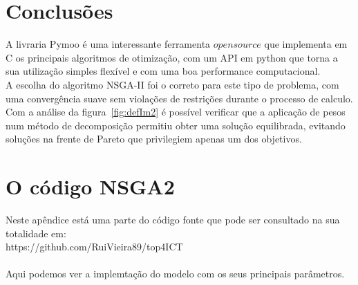 \documentclass[a4paper,12pt]{article}
\begin{document}
\section{Conclusões}

A livraria Pymoo é uma interessante ferramenta $open source$ que implementa em C os principais algoritmos de otimização, com um API em python que torna a sua utilização simples flexível e com uma boa performance computacional.\\
A escolha do algoritmo NSGA-II foi o correto para este tipo de problema, com uma convergência suave sem violações de restrições durante o processo de calculo.\\
Com a análise da figura~\ref{fig:defIm2} é possível verificar que a aplicação de pesos num método de decomposição permitiu obter uma solução equilibrada, evitando soluções na frente de Pareto que privilegiem apenas um dos objetivos.\\

\newpage

\appendix

\section{O código NSGA2}\label{A:1}

Neste apêndice está uma parte do código fonte que pode ser consultado na sua totalidade em:\\ https://github.com/RuiVieira89/top4ICT\\
\\
Aqui podemos ver a implemtação do modelo com os seus principais parâmetros.
\end{document}
